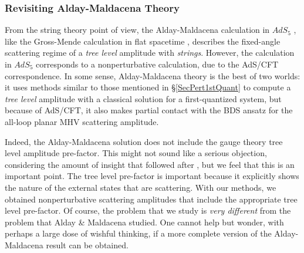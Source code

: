 \subsubsection*{Revisiting Alday-Maldacena Theory}
From the string theory point of view, the Alday-Maldacena calculation in $AdS_{5}$ \cite{Alday:2007hr}, like the Gross-Mende calculation in flat spacetime \cite{Gross:1987kza}, describes the fixed-angle scattering regime of a \textit{tree level} amplitude with \textit{strings}. However, the calculation in $AdS_{5}$ corresponds to a nonperturbative calculation, due to the AdS/CFT correspondence. In some sense, Alday-Maldacena theory is the best of two worlds: it uses methods similar to those mentioned in \S\ref{SecPert1stQuant} to compute a \textit{tree level} amplitude with a classical solution for a first-quantized system, but because of AdS/CFT, it also makes partial contact with the BDS ansatz for the all-loop planar MHV scattering amplitude.

Indeed, the Alday-Maldacena solution does not include the gauge theory tree level amplitude pre-factor. This might not sound like a serious objection, considering the amount of insight that followed after \cite{Alday:2007hr}, but we feel that this is an important point. The tree level pre-factor is important because it explicitly shows the nature of the external states that are scattering. With our methods, we obtained nonperturbative scattering amplitudes that include the appropriate tree level pre-factor. Of course, the problem that we study is \textit{very different} from the problem that Alday \& Maldacena studied. One cannot help but wonder, with perhaps a large dose of wishful thinking, if a more complete version of the Alday-Maldacena result can be obtained.
